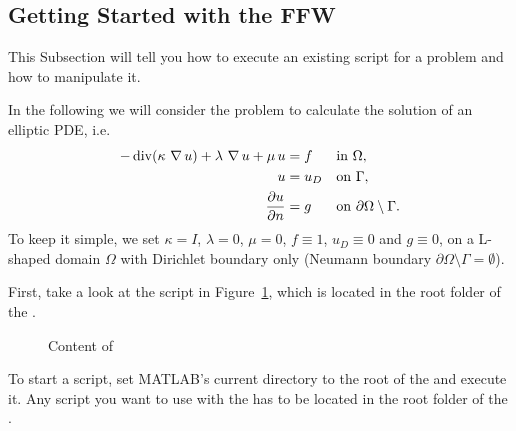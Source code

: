 \subsection{Getting Started with the FFW}
\label{sect:QuickStart:gettingStarted}

\noindent This Subsection will tell you how to execute an existing script for a problem and how to manipulate it.\medskip

\noindent In the following we will consider the problem to calculate the solution of an elliptic PDE, i.e.
\begin{align*}
- \operatorname{div} (\kappa \,\operatorname{\nabla} u) + \lambda \,\operatorname{\nabla} u + \mu \, u &= f &&\text{in } \Omega,\\
u &= u_D &&\text{on } \Gamma,\\
\frac{\partial u}{\partial n} &= g &&\text{on } \partial\Omega \setminus \Gamma.
\end{align*}
To keep it simple, we set $\kappa = I$, $\lambda = 0$, $\mu = 0$, $f \equiv 1$, $u_D \equiv 0$ and $g \equiv 0$, on a L-shaped domain $\Omega$ with Dirichlet boundary only (Neumann boundary $\partial\Omega \setminus \Gamma = \emptyset$).\medskip

\noindent First, take a look at the script in Figure~\ref{sect:Quickstart.fig.code:gettingStarted}, which is located in the root folder of the \FFW\!.

\begin{figure}[ht!]
\caption{Content of }\label{sect:Quickstart.fig.code:gettingStarted}
\end{figure}

\medskip
\noindent To start a script, set MATLAB's current directory to the root of the \FFW and execute it. Any script you want to use with the \FFW has to be located in the root folder of the \FFW\!.\medskip

